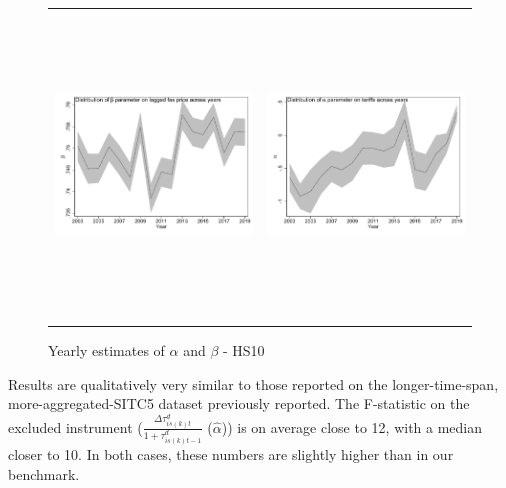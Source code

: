 \documentclass[a4paper,11pt]{article}
\begin{document}
\begin{figure}[htbp]
\caption{Yearly estimates of $\alpha$ and $\beta$ - HS10}\label{fig: FS_IV_HS10}
\begin{center}
\begin{tabular}{cc}
\includegraphics[width=3.2in, height=3.2in,keepaspectratio]{beta_lag_HS10.pdf}
& \includegraphics[width=3.2in,height=3.2in,keepaspectratio]{alpha_tariff_HS10.pdf} \\
\end{tabular}
\end{center}
\end{figure}

Results are qualitatively very similar to those reported on the longer-time-span, more-aggregated-SITC5 dataset previously reported. The F-statistic on the excluded instrument ($\frac{\Delta \tau^d_{is(k)t}}{1+\tau_{is(k)t-1}^d}$ ($\widehat{\alpha}$)) is on average close to 12, with a median closer to 10. In both cases, these numbers are slightly higher than in our benchmark.
\end{document}

